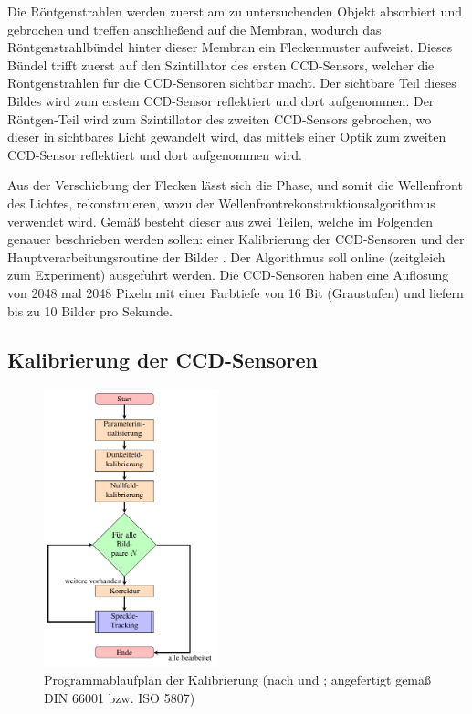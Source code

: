 Die Röntgenstrahlen werden zuerst am zu untersuchenden Objekt absorbiert und gebrochen und treffen anschließend auf die Membran, wodurch das Röntgenstrahlbündel hinter dieser Membran ein Fleckenmuster aufweist. Dieses Bündel trifft zuerst auf den Szintillator des ersten \gls{CCD}-Sensors, welcher die Röntgenstrahlen für die \gls{CCD}-Sensoren sichtbar macht. Der sichtbare Teil dieses Bildes wird zum erstem \gls{CCD}-Sensor reflektiert und dort aufgenommen. Der Röntgen-Teil wird zum Szintillator des zweiten \gls{CCD}-Sensors gebrochen, wo dieser in sichtbares Licht gewandelt wird, das mittels einer Optik zum zweiten \gls{CCD}-Sensor reflektiert und dort aufgenommen wird. 

Aus der Verschiebung der Flecken lässt sich die Phase, und somit die Wellenfront des Lichtes, rekonstruieren, wozu der Wellenfrontrekonstruktionsalgorithmus verwendet wird. Gemäß \citeauthor{Ber13} besteht dieser aus zwei Teilen, welche im Folgenden genauer beschrieben werden sollen: einer Kalibrierung der \gls{CCD}-Sensoren und der Hauptverarbeitungsroutine der Bilder . Der Algorithmus soll online (zeitgleich zum Experiment) ausgeführt werden. Die \gls{CCD}-Sensoren haben eine Auflösung von 2048 mal 2048 Pixeln mit einer Farbtiefe von 16 Bit (Graustufen) und liefern bis zu 10 Bilder pro Sekunde.

\subsection{Kalibrierung der CCD-Sensoren}

\begin{figure}[h!]
	\centering
	\includegraphics[width=0.45\textwidth]{pdf/graph_init}
	\caption[Kalibrierung]{Programmablaufplan der Kalibrierung (nach  und \cite{Coj17}; angefertigt gemäß DIN 66001 bzw. ISO 5807)}
	\label{fig:graph_kalibrierung}
\end{figure}

